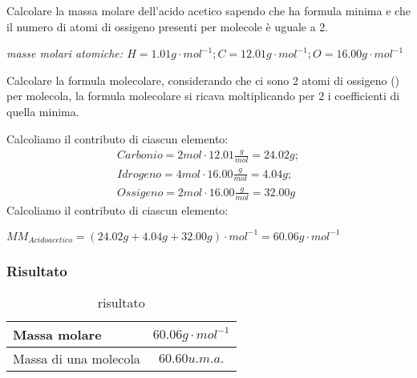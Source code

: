 \begin{ess}
  \label{ess:esMolEnumDiMol1}

Calcolare la massa molare dell'acido acetico sapendo che ha formula minima  e che il numero di atomi di
ossigeno presenti per molecole è uguale a 2.
\begin{center}
  \textit{masse molari atomiche: $H=1.01g\cdot mol^{-1};C=12.01g\cdot mol^{-1};O=16.00g\cdot mol^{-1}$}
\end{center}
\begin{tasks}
  \task Calcolare la formula molecolare, considerando che ci sono 2 atomi di ossigeno () per molecola, la
  formula molecolare si ricava moltiplicando per 2 i coefficienti di quella minima.
  \begin{center}
  \end{center}
  \task Calcoliamo il contributo di ciascun elemento:
  \begin{eqnarray*}
    Carbonio=2mol\cdot 12.01\frac{g}{mol}=24.02g;\\
    Idrogeno=4mol\cdot 16.00\frac{g}{mol}=4.04g;\\
    Ossigeno=2mol\cdot 16.00\frac{g}{mol}=32.00g
  \end{eqnarray*}
  \task Calcoliamo il contributo di ciascun elemento:
  \begin{center}
    $MM_{Acido acetico}=(24.02g+4.04g+32.00g)\cdot mol^{-1}=60.06g\cdot mol^{-1}$
  \end{center}
\end{tasks}
\subsubsection{Risultato}
\label{sec:esMolEnumDiMolris1}

\begin{table}[ht!]
  \centering
  \begin{tabular}{lc}
    Massa molare & $60.06g\cdot mol^{-1}$\\\hline
    Massa di una molecola & $60.60 u.m.a.$\\\hline
  \end{tabular}
  \caption{risultato}
  \label{tab:risesmol1}
\end{table}
\end{ess}
\clearpage
